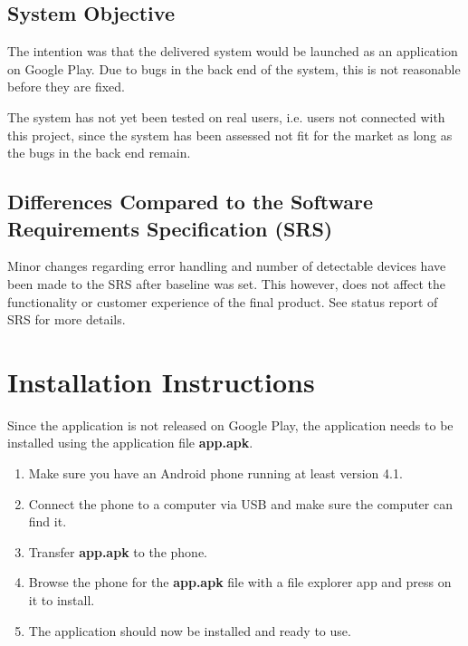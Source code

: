 \documentclass[a4paper]{article}
\begin{document}
\subsection{System Objective}
The intention was that the delivered system would be launched as an application on Google Play. Due to bugs in the back end of the system, this is not reasonable before they are fixed. 

The system has not yet been tested on real users, i.e. users not connected with this project, since the system has been assessed not fit for the market as long as the bugs in the back end remain.  

\subsection{Differences Compared to the Software Requirements Specification (SRS)}
Minor changes regarding error handling and number of detectable devices have been made to the SRS after baseline was set. This however, does not affect the functionality or customer experience of the final product. See status report of SRS for more details. 


\section{Installation Instructions}
Since the application is not released on Google Play, the application needs to be installed using the application file \textbf{app.apk}. 

\begin{enumerate}
\item Make sure you have an Android phone running at least version 4.1.
\item Connect the phone to a computer via USB and make sure the computer can find it.
\item Transfer \textbf{app.apk} to the phone.
\item Browse the phone for the \textbf{app.apk} file with a file explorer app and press on it to install.
\item The application should now be installed and ready to use.
\end{enumerate}
\end{document}
